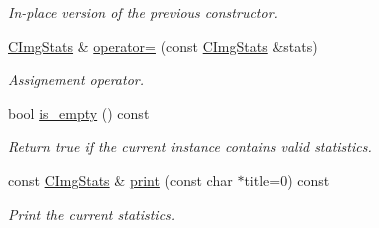 \begin{DoxyCompactItemize}
\begin{DoxyCompactList}\small\item\em In-\/place version of the previous constructor. \item\end{DoxyCompactList}\item 
\hypertarget{structcimg__library_1_1_c_img_stats_affe7f2dc9417956894d2b4f95e60b623}{
\hyperlink{structcimg__library_1_1_c_img_stats}{CImgStats} \& \hyperlink{structcimg__library_1_1_c_img_stats_affe7f2dc9417956894d2b4f95e60b623}{operator=} (const \hyperlink{structcimg__library_1_1_c_img_stats}{CImgStats} \&stats)}
\label{structcimg__library_1_1_c_img_stats_affe7f2dc9417956894d2b4f95e60b623}

\begin{DoxyCompactList}\small\item\em Assignement operator. \item\end{DoxyCompactList}\item 
\hypertarget{structcimg__library_1_1_c_img_stats_a97e0642b01dff9a58e83acd1e598b3de}{
bool \hyperlink{structcimg__library_1_1_c_img_stats_a97e0642b01dff9a58e83acd1e598b3de}{is\_\-empty} () const }
\label{structcimg__library_1_1_c_img_stats_a97e0642b01dff9a58e83acd1e598b3de}

\begin{DoxyCompactList}\small\item\em Return true if the current instance contains valid statistics. \item\end{DoxyCompactList}\item 
const \hyperlink{structcimg__library_1_1_c_img_stats}{CImgStats} \& \hyperlink{structcimg__library_1_1_c_img_stats_a84a394e944020659edbff6f68d585bc0}{print} (const char $\ast$title=0) const 
\begin{DoxyCompactList}\small\item\em Print the current statistics. \item\end{DoxyCompactList}\end{DoxyCompactItemize}

